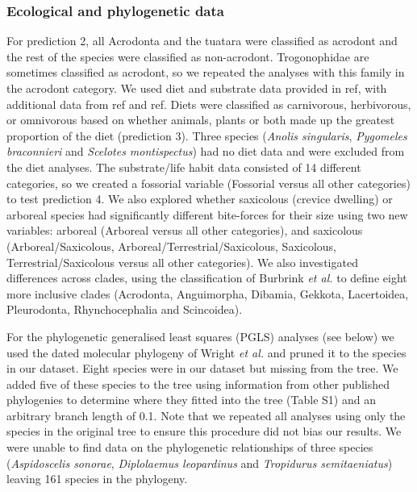 \documentclass[a4paper, 12pt]{article}
\begin{document}
\subsubsection{Ecological and phylogenetic data}

For prediction 2, all Acrodonta and the tuatara were classified as acrodont and the rest of the species were classified as non-acrodont.
Trogonophidae are sometimes classified as acrodont\cite{jenkins2020bite}, so we repeated the analyses with this family in the acrodont category.
We used diet and substrate data provided in ref\cite{meiri2018traits}, with additional data from ref\cite{metzger2005correlations} and ref\cite{cooper2002distribution}. 
Diets were classified as carnivorous, herbivorous, or omnivorous based on whether animals, plants or both made up the greatest proportion of the diet (prediction 3\cite{meiri2018traits}).
Three species (\textit{Anolis singularis}, \textit{Pygomeles braconnieri} and \textit{Scelotes montispectus}) had no diet data and were excluded from the diet analyses. 
The substrate/life habit data\cite{meiri2018traits} consisted of 14 different categories, so we created a fossorial variable (Fossorial versus all other categories) to test prediction 4.  
We also explored whether saxicolous (crevice dwelling) or arboreal species had significantly different bite-forces for their size using two new variables: arboreal (Arboreal versus all other categories), and saxicolous (Arboreal/Saxicolous, Arboreal/Terrestrial/Saxicolous, Saxicolous, Terrestrial/Saxicolous versus all other categories). 
We also investigated differences across clades, using the classification of Burbrink \textit{et al.}\cite{burbrink2020interrogating} to define eight more inclusive clades (Acrodonta, Anguimorpha, Dibamia, Gekkota, Lacertoidea, Pleurodonta, Rhynchocephalia and Scincoidea). 

For the phylogenetic generalised least squares (PGLS) analyses (see below) we used the dated molecular phylogeny of Wright \textit{et al.}\cite{wright2015came} and pruned it to the species in our dataset. 
Eight species were in our dataset but missing from the tree. We added five of these species to the tree using information from other published phylogenies to determine where they fitted into the tree (Table S1) and an arbitrary branch length of 0.1. 
Note that we repeated all analyses using only the species in the original tree to ensure this procedure did not bias our results. We were unable to find data on the phylogenetic relationships of three species (\textit{Aspidoscelis sonorae}, \textit{Diplolaemus leopardinus} and \textit{Tropidurus semitaeniatus}) leaving 161 species in the phylogeny.
\end{document}
